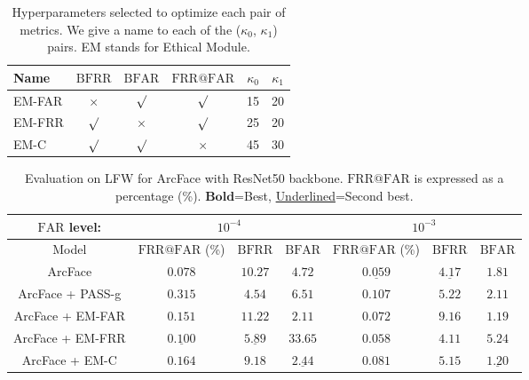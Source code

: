 \documentclass[nohyperref]{article}
\theoremstyle{plain}
\theoremstyle{definition}
\theoremstyle{remark}
\begin{document}
\begin{table}[h!]
\caption{Hyperparameters selected to optimize each pair of metrics. We give a name to each of the ($\kappa_0$, $\kappa_1$) pairs. EM stands for Ethical Module.}\label{tab:kappa_choice}
\vskip 0.1in
\begin{center}
\begin{small}
\begin{sc}
\begin{tabular}{lccccr}
\toprule
Name & $\mathrm{BFRR}$ & $\mathrm{BFAR}$ & $\mathrm{FRR}@\mathrm{FAR}$ & $\kappa_0$ & $\kappa_1$ \\
\midrule 
EM-FAR & $\times$ & $\surd$ & $\surd$ & 15 & 20\\
EM-FRR & $\surd$ & $\times$ & $\surd$ & 25 & 20\\
EM-C & $\surd$ & $\surd$ & $\times$ & 45 & 30\\
\bottomrule
\end{tabular}
\end{sc}
\end{small}
\end{center}
\vskip -0.2in
\end{table}




\begin{table*}[h!]
\caption{Evaluation on LFW for ArcFace with ResNet50 backbone. $\mathrm{FRR}@\mathrm{FAR}$ is expressed as a percentage (\%). $\mathbf{Bold}$=Best, \underline{Underlined}=Second best.}
\vskip 0.1in
\begin{center}
\begin{small}
\begin{sc}
\begin{tabular}{ c | ccc | ccc}
 $\mathrm{FAR}$ level:          & \multicolumn{3}{c}{ $10^{-4}$} & \multicolumn{3}{c}{ $10^{-3}$} \\ 
 \toprule
  Model     & $\mathrm{FRR}@\mathrm{FAR}$ (\%)  & $\mathrm{BFRR}$  & $\mathrm{BFAR}$  & $\mathrm{FRR}@\mathrm{FAR}$ (\%)  & $\mathrm{BFRR}$        & $\mathrm{BFAR}$        \\ \midrule 
                               ArcFace  & $\mathbf{0.078}$  & $10.27$ & $4.72$  & $\underline{0.059}$   & $\underline{4.17}$  & $1.81$ \\ 
                ArcFace + PASS-g & $0.315$ & $\mathbf{4.54}$ & $6.51$ & $0.107$ & $5.22$ & $2.11$\\
                               
   ArcFace + EM-FAR & $0.151$  & $11.22$ & $\mathbf{2.11}$  & $0.072$ & $9.16$ &  $\mathbf{1.19}$ \\
                               ArcFace + EM-FRR & $\underline{0.100}$ & $\underline{5.89}$ & $33.65$ & $\mathbf{0.058}$ & $\mathbf{4.11}$  & $5.24$ \\
                               ArcFace + EM-C & $0.164$  & $9.18$ & $\underline{2.44}$ & $0.081$ & $5.15$  & $\underline{1.20}$  \\ \bottomrule
\end{tabular}
\end{sc}
\end{small}
\end{center}
\vskip -0.1in
\label{table:LFW_1vs1_models}
\end{table*}
\end{document}
